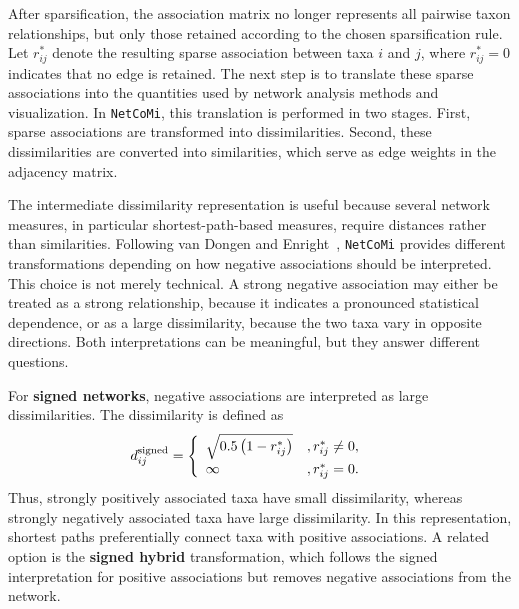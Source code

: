 After sparsification, the association matrix no longer represents all pairwise taxon relationships, but only those retained according to the chosen sparsification rule. Let $r_{ij}^{*}$ denote the resulting sparse association between taxa $i$ and $j$, where $r_{ij}^{*}=0$ indicates that no edge is retained. The next step is to translate these sparse associations into the quantities used by network analysis methods and visualization. In \texttt{NetCoMi}, this translation is performed in two stages. First, sparse associations are transformed into dissimilarities. Second, these dissimilarities are converted into similarities, which serve as edge weights in the adjacency matrix.

The intermediate dissimilarity representation is useful because several network measures, in particular shortest-path-based measures, require distances rather than similarities. Following van Dongen and Enright~\citep{vandongen2012metric}, \texttt{NetCoMi} provides different transformations depending on how negative associations should be interpreted. This choice is not merely technical. A strong negative association may either be treated as a strong relationship, because it indicates a pronounced statistical dependence, or as a large dissimilarity, because the two taxa vary in opposite directions. Both interpretations can be meaningful, but they answer different questions.

For \textbf{signed networks}, negative associations are interpreted as large dissimilarities. The dissimilarity is defined as
\begin{equation}
\label{eq:5net:net_construct:signed_dissimilarity}
d_{ij}^{\mathrm{signed}} =
\begin{cases}
\begin{array}{ll@{\quad}l}
\sqrt{0.5\left(1-r_{ij}^{*}\right)} & , r_{ij}^{*} \neq 0,\\
\infty & , r_{ij}^{*} = 0.
\end{array}
\end{cases}
\end{equation}
Thus, strongly positively associated taxa have small dissimilarity, whereas strongly negatively associated taxa have large dissimilarity. In this representation, shortest paths preferentially connect taxa with positive associations. A related option is the \textbf{signed hybrid} transformation, which follows the signed interpretation for positive associations but removes negative associations from the network.

